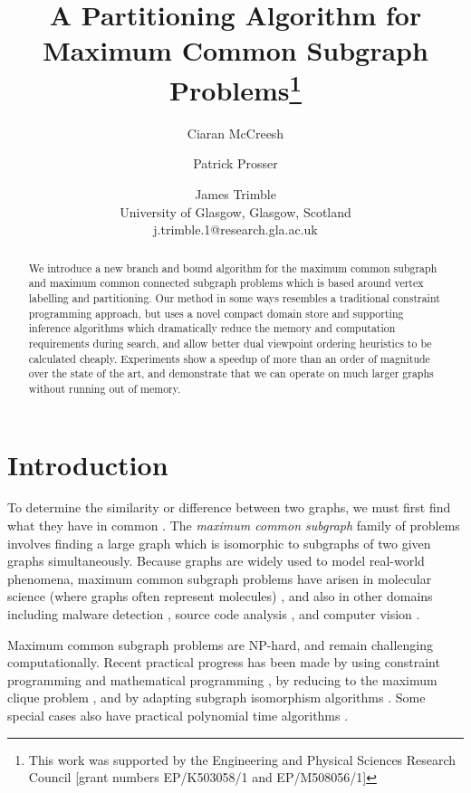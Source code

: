 \documentclass[letterpaper]{article}
\title{A Partitioning Algorithm for Maximum Common Subgraph Problems\thanks{This work
was supported by the Engineering and Physical Sciences Research Council [grant
numbers EP/K503058/1 and EP/M508056/1]}}
\author{Ciaran McCreesh \and Patrick Prosser \and James Trimble \\
University of Glasgow, Glasgow, Scotland \\
j.trimble.1@research.gla.ac.uk}
\newcommand{\citep}[1]{\cite{#1}}
\begin{document}
\maketitle

\begin{abstract}
    We introduce a new branch and bound algorithm for the maximum common
    subgraph and maximum common connected subgraph problems which is based
    around vertex labelling and partitioning. Our method in some ways resembles
    a traditional constraint programming approach, but uses a novel compact
    domain store and supporting inference algorithms which dramatically reduce
    the memory and computation requirements during search, and allow better
    dual viewpoint ordering heuristics to be calculated cheaply.  Experiments
    show a speedup of more than an order of magnitude over the state of the
    art, and demonstrate that we can operate on much larger graphs without
    running out of memory.
\end{abstract}

\section{Introduction}

To determine the similarity or difference between two graphs, we must first
find what they have in common
\citep{DBLP:journals/prl/Bunke97,DBLP:journals/prl/FernandezV01,KriegeThesis}.
The \emph{maximum common subgraph} family of problems involves finding a large
graph which is isomorphic to subgraphs of two given graphs simultaneously.
Because graphs are widely used to model real-world phenomena, maximum common
subgraph problems have arisen in molecular science (where graphs often represent
molecules)
\citep{DBLP:journals/jcamd/RaymondW02a,Ehrlich:2011,DAM2014,Grindley1993707},
and also in other domains including malware detection
\citep{DBLP:journals/compsec/ParkRS13}, source code analysis
\cite{DBLP:journals/tkde/DjokoCH97}, and computer vision
\cite{DBLP:journals/jair/CookH94}.

Maximum common subgraph problems are NP-hard, and remain challenging
computationally. Recent practical progress has been made by using constraint
programming \citep{DBLP:conf/mco/VismaraV08,DBLP:conf/cp/NdiayeS11,DBLP:conf/cp/McCreeshNPS16} and
mathematical programming \citep{DBLP:journals/dam/BahienseMPS12}, by reducing
to the maximum clique problem \citep{LeviG,DBLP:conf/cp/McCreeshNPS16}, and by
adapting subgraph isomorphism algorithms \citep{UpcomingAAAIPaper}. Some
special cases also have practical polynomial time algorithms
\citep{DBLP:conf/mfcs/DroschinskyKM16,DBLP:conf/sofsem/DroschinskyKM17}.
\end{document}

